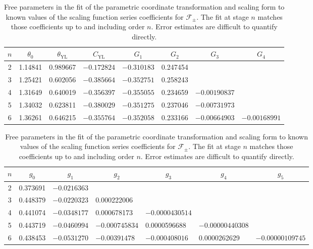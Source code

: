 \documentclass[
aps,
pre,
preprint,
longbibliography,
floatfix
]{revtex4-2}
\begin{document}
\begin{table}
  \singlespacing
  \raggedright
  \begin{tabular}{|c|lllllll}
    \hline
    \multicolumn{1}{|c|}{$n$} &
      \multicolumn{1}{c}{$\theta_0$} &
      \multicolumn{1}{c}{$\theta_\mathrm{YL}$} &
      \multicolumn{1}{c}{$C_\mathrm{YL}$} &
      \multicolumn{1}{c}{$G_1$} &
      \multicolumn{1}{c}{$G_2$} &
      \multicolumn{1}{c}{$G_3$} &
      \multicolumn{1}{c}{$G_4$} \\
    \hline
    2 &
      1.14841 &
      0.989667 &
      $-0.172824$ &
      $-0.310183$ &
      0.247454 \\
    3 &
      1.25421 &
      0.602056 &
      $-0.385664$ &
      $-0.352751$ &
      0.258243 \\
    4 &
      1.31649 &
      0.640019 &
      $-0.356397$ &
      $-0.355055$ &
      0.234659 &
      $-0.00190837$ \\
    5 &
      1.34032 &
      0.623811 &
      $-0.380029$ &
      $-0.351275$ &
      0.237046 &
      $-0.00731973$ \\
    6 &
      1.36261 &
      0.646215 &
      $-0.355764$ &
      $-0.352058$ &
      0.233166 &
      $-0.00664903$ &
      $-0.00168991$ \\
      \hline
  \end{tabular}
  \begin{tabular}{|c|llllll}
    \hline
    $n$ &
      \multicolumn{1}{c}{$g_0$} &
      \multicolumn{1}{c}{$g_1$} &
      \multicolumn{1}{c}{$g_2$} &
      \multicolumn{1}{c}{$g_3$} &
      \multicolumn{1}{c}{$g_4$} &
      \multicolumn{1}{c}{$g_5$} \\
    \hline
    2 &
      0.373691 &
      $-0.0216363$ \\
    3 &
      0.448379 &
      $-0.0220323$ &
      \hphantom{$-$}0.000222006 \\
    4 &
      0.441074 &
      $-0.0348177$ &
      \hphantom{$-$}0.000678173 &
      $-0.0000430514$ \\
    5 &
      0.443719 &
      $-0.0460994$ &
      $-0.000745834$ &
      \hphantom{$-$}0.0000596688 &
      $-0.00000440308$ \\
    6 &
      0.438453 &
      $-0.0531270$ &
      $-0.00391478$ &
      $-0.000408016$ &
      \hphantom{$-$}0.0000262629 &
      $-0.00000109745$ \\
    \hline
  \end{tabular}
  \caption{
    Free parameters in the fit of the parametric coordinate transformation and
    scaling form to known values of the scaling function series coefficients
    for $\mathcal F_\pm$. The fit at stage $n$ matches those coefficients up to
    and including order $n$. Error estimates are difficult to quantify directly.
  } \label{tab:fits}
\end{table}
\end{document}
